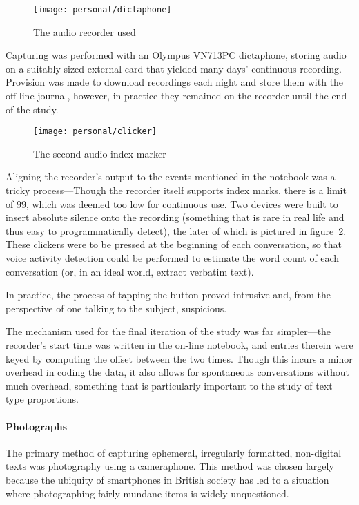 \begin{figure}[p]
    \centering
    \texttt{[image: personal/dictaphone]}
    \caption{The audio recorder used}
    \label{fig:personal:audiorecorder}
\end{figure}



Capturing was performed with an Olympus VN713PC dictaphone, storing audio on a suitably sized external card that yielded many days' continuous recording.  Provision was made to download recordings each night and store them with the off-line journal, however, in practice they remained on the recorder until the end of the study.


\begin{figure}[p]
    \centering
    \texttt{[image: personal/clicker]}
    \caption{The second audio index marker}
    \label{fig:personal:clicker}
\end{figure}


Aligning the recorder's output to the events mentioned in the notebook was a tricky process---Though the recorder itself supports index marks, there is a limit of 99, which was deemed too low for continuous use.  Two devices were built to insert absolute silence onto the recording (something that is rare in real life and thus easy to programmatically detect), the later of which is pictured in figure~\ref{fig:personal:clicker}.  These clickers were to be pressed at the beginning of each conversation, so that voice activity detection could be performed to estimate the word count of each conversation (or, in an ideal world, extract verbatim text).

In practice, the process of tapping the button proved intrusive and, from the perspective of one talking to the subject, suspicious.

The mechanism used for the final iteration of the study was far simpler---the recorder's start time was written in the on-line notebook, and entries therein were keyed by computing the offset between the two times.  Though this incurs a minor overhead in coding the data, it also allows for spontaneous conversations without much overhead, something that is particularly important to the study of text type proportions.



\paragraph{Photographs}
The primary method of capturing ephemeral, irregularly formatted, non-digital texts was photography using a cameraphone.  This method was chosen largely because the ubiquity of smartphones in British society has led to a situation where photographing fairly mundane items is widely unquestioned.

